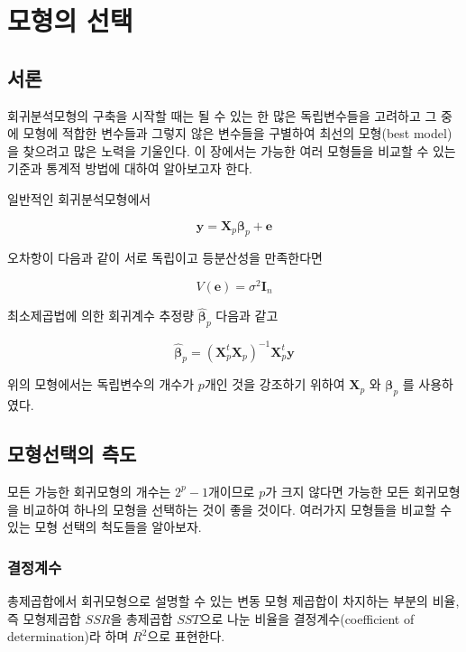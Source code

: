 \documentclass[
  10pt,
]{book}
\theoremstyle{definition}
\theoremstyle{definition}
\theoremstyle{definition}
\theoremstyle{definition}
\theoremstyle{remark}
\begin{document}
\hypertarget{modelselection}{%
\chapter{모형의 선택}\label{modelselection}}

\hypertarget{uxc11cuxb860-2}{%
\section{서론}\label{uxc11cuxb860-2}}

회귀분석모형의 구축을 시작할 때는 될 수 있는 한 많은 독립변수들을 고려하고 그 중에 모형에 적합한 변수들과 그렇지 않은 변수들을 구별하여 최선의 모형(best model)을 찾으려고 많은 노력을 기울인다. 이 장에서는 가능한 여러 모형들을 비교할 수 있는 기준과 통계적 방법에 대하여 알아보고자 한다.

일반적인 회귀분석모형에서

\[ {\bm y} = {\bm X_p} {\bm \beta}_p + \bm e \]

오차항이 다음과 같이 서로 독립이고 등분산성을 만족한다면

\[ V(\bm e) =\sigma^2 \bm I_n \]

최소제곱법에 의한 회귀계수 추정량 \(\hat {\bm \beta}_p\) 다음과 같고

\[  \hat {\bm \beta}_p = ({\bm X}_p^t{\bm X}_p)^{-1}{\bm X}_p^t{\bm y} \]

위의 모형에서는 독립변수의 개수가 \(p\)개인 것을 강조하기 위하여 \({\bm X}_p\) 와 \({\bm \beta}_p\) 를 사용하였다.

\hypertarget{uxbaa8uxd615uxc120uxd0dduxc758-uxce21uxb3c4}{%
\section{모형선택의 측도}\label{uxbaa8uxd615uxc120uxd0dduxc758-uxce21uxb3c4}}

모든 가능한 회귀모형의 개수는 \(2^p-1\)개이므로 \(p\)가 크지 않다면 가능한 모든 회귀모형을 비교하여 하나의 모형을 선택하는 것이 좋을 것이다. 여러가지 모형들을 비교할 수 있는 모형 선택의 척도들을 알아보자.

\hypertarget{uxacb0uxc815uxacc4uxc218}{%
\subsection{결정계수}\label{uxacb0uxc815uxacc4uxc218}}

총제곱합에서 회귀모형으로 설명할 수 있는 변동 모형 제곱합이 차지하는 부분의 비율, 즉 모형제곱합 \(SSR\)을 총제곱합 \(SST\)으로 나눈 비율을 결정계수(coefficient of determination)라 하며 \(R^2\)으로 표현한다.
\end{document}
